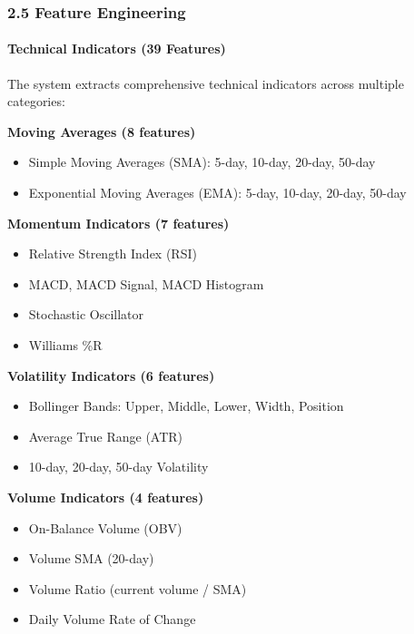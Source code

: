 \documentclass[
]{article}
\begin{document}
\subsubsection{2.5 Feature Engineering}\label{25-feature-engineering}

\paragraph{\texorpdfstring{\textbf{Technical Indicators (39
Features)}}{Technical Indicators (39 Features)}}\label{technical-indicators-39-features}

The system extracts comprehensive technical indicators across multiple
categories:

\textbf{Moving Averages (8 features)}

\begin{itemize}
\item
  Simple Moving Averages (SMA): 5-day, 10-day, 20-day, 50-day
\item
  Exponential Moving Averages (EMA): 5-day, 10-day, 20-day, 50-day
\end{itemize}

\textbf{Momentum Indicators (7 features)}

\begin{itemize}
\item
  Relative Strength Index (RSI)
\item
  MACD, MACD Signal, MACD Histogram
\item
  Stochastic Oscillator
\item
  Williams \%R
\end{itemize}

\textbf{Volatility Indicators (6 features)}

\begin{itemize}
\item
  Bollinger Bands: Upper, Middle, Lower, Width, Position
\item
  Average True Range (ATR)
\item
  10-day, 20-day, 50-day Volatility
\end{itemize}

\textbf{Volume Indicators (4 features)}

\begin{itemize}
\item
  On-Balance Volume (OBV)
\item
  Volume SMA (20-day)
\item
  Volume Ratio (current volume / SMA)
\item
  Daily Volume Rate of Change
\end{itemize}
\end{document}
